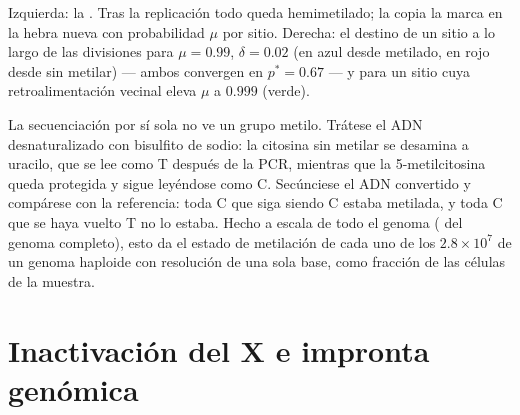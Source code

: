 \begin{omfigure}
{\small Izquierda: la . Tras la replicación
todo  queda hemimetilado; la  copia la marca en la hebra nueva
con probabilidad $\mu$ por sitio. Derecha: el destino de un sitio a lo
largo de las divisiones para $\mu = 0.99$, $\delta = 0.02$ (en azul desde
metilado, en rojo desde sin metilar) --- ambos convergen en $p^{*} = 0.67$
--- y para un sitio cuya retroalimentación vecinal eleva $\mu$ a $0.999$
(verde).}
\end{omfigure}

\begin{method}\label{met:b3:chromatin-epigenetics:bisulfite}
La secuenciación por sí sola no ve un grupo metilo. Trátese el ADN
desnaturalizado con bisulfito de sodio: la citosina sin metilar se
desamina a uracilo, que se lee como T después de la PCR, mientras que la
5-metilcitosina queda protegida y sigue leyéndose como C. Secúnciese el
ADN convertido y compárese con la referencia: toda C que siga siendo C
estaba metilada, y toda C que se haya vuelto T no lo estaba. Hecho a
escala de todo el genoma ( del genoma
completo), esto da el estado de metilación de cada uno de los
$2.8\times 10^{7}$  de un genoma haploide con resolución de una sola
base, como fracción de las células de la muestra.
\end{method}

\section{Inactivación del X e impronta genómica}

